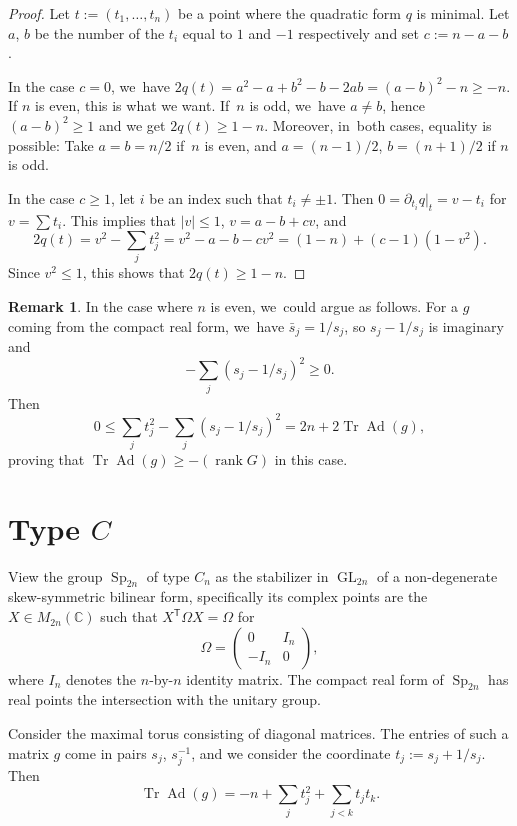 \documentclass[JEP,XML,SOM,Unicode,NoFloatCountersInSection,published]{cedram}
\theoremstyle{definition}
\newtheorem{rmk}[equation]{Remark}
\newcommand{\trans}{\mathsf{T}}
\newcommand{\C}{\mathbb{C}}
\DeclareMathOperator{\GL}{GL}
\DeclareMathOperator{\Sp}{Sp}
\DeclareMathOperator{\Tr}{Tr}
\DeclareMathOperator{\Ad}{Ad}
\DeclareMathOperator{\rank}{rank}
\begin{document}
\begin{proof}
Let $t := (t_1, \ldots, t_n)$ be a point where the quadratic form $q$ is minimal. Let $a$, $b$ be the number of the $t_i$ equal to $1$ and $-1$ respectively and set $c := n - a - b$.

In the case $c = 0$, we~have $2q(t) = a^2 - a + b^2 - b - 2ab = (a-b)^2 - n \ge -n$. If $n$ is even, this is what we want. If~$n$ is odd, we~have $a \ne b$, hence $(a-b)^2 \ge 1$ and we get $2q(t) \ge 1-n$. Moreover, in~both cases, equality is possible: Take $a = b = n/2$ if~$n$ is even, and $a = (n-1)/2$, $b = (n+1)/2$ if $n$ is odd.

In the case $c \ge 1$, let $i$ be an index such that $t_i \ne \pm 1$. Then $0 = \partial_{t_i} q\vert_t = v - t_i$ for $v = \sum t_i$. This implies that $|v| \le 1$, $v = a - b + cv$, and
\[
2q(t) = v^2 - \sum_j t_j^2 = v^2 - a - b - cv^2 = (1 - n) + (c-1)(1 - v^2).
\]
Since $v^2 \le 1$, this shows that $2q(t) \ge 1- n$.
\end{proof}

\begin{rmk}
In the case where $n$ is even, we~could argue as follows.
For a $g$ coming from the compact real form, we~have $\bar{s}_j = 1/s_j$, so $s_j - 1/s_j$ is imaginary and
\[
-\sum_j (s_j - 1/s_j)^2 \ge 0.
\]
Then
\[
0 \le \sum_j t_j^2 - \sum_j (s_j - 1/s_j)^2 = 2n + 2\Tr\Ad(g),
\]
proving that $\Tr \Ad(g) \ge -(\rank G)$ in this case.
\end{rmk}

\section{Type \texorpdfstring{$C$}{C}} \label{C.sec}

View the group $\Sp_{2n}$ of type $C_n$ as the stabilizer in $\GL_{2n}$ of a non-degenerate skew-symmetric bilinear form, specifically its complex points are the $X \in M_{2n}(\C)$ such that $X^\trans \Omega X = \Omega$ for
\[
\Omega = \begin{pmatrix} 0 & I_n \\ -I_n & 0 \end{pmatrix},
\]
where $I_n$ denotes the $n$-by-$n$ identity matrix. The compact real form of $\Sp_{2n}$ has real points the intersection with the unitary group.

Consider the maximal torus consisting of diagonal matrices. The entries of such a matrix $g$ come in pairs $s_j$, $s_j^{-1}$, and we consider the coordinate $t_j := s_j + 1/s_j$. Then
\begin{equation} \label{C.ad}
\Tr \Ad(g) = -n + \sum_j t_j^2 + \sum_{j < k} t_j t_k.
\end{equation}
\end{document}
